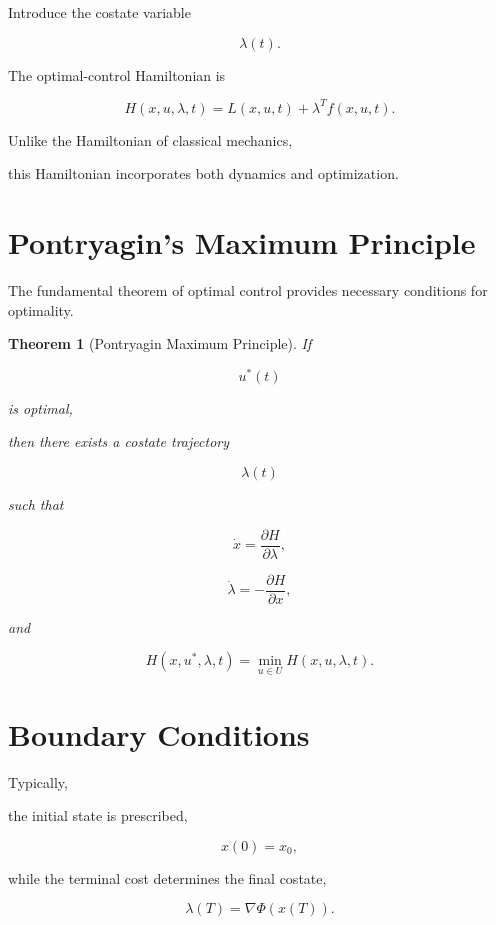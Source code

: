 \documentclass[11pt,fleqn]{book}
\numberwithin{equation}{chapter}
\theoremstyle{plain}
\newtheorem{theorem}{Theorem}[chapter]
\theoremstyle{definition}
\theoremstyle{remark}
\begin{document}
Introduce the costate variable

\[
\lambda(t).
\]

The optimal-control Hamiltonian is

\[
\boxed{
H(x,u,\lambda,t)
=
L(x,u,t)
+
\lambda^{T}f(x,u,t).
}
\]

Unlike the Hamiltonian of classical mechanics,

this Hamiltonian incorporates both dynamics and optimization.


\section{Pontryagin's Maximum Principle}

The fundamental theorem of optimal control provides necessary conditions
for optimality.

\begin{theorem}[Pontryagin Maximum Principle]

If

\[
u^*(t)
\]

is optimal,

then there exists a costate trajectory

\[
\lambda(t)
\]

such that

\[
\boxed{
\dot{x}
=
\frac{\partial H}{\partial\lambda},
}
\]

\[
\boxed{
\dot{\lambda}
=
-
\frac{\partial H}{\partial x},
}
\]

and

\[
\boxed{
H(x,u^*,\lambda,t)
=
\min_{u\in U}
H(x,u,\lambda,t).
}
\]

\end{theorem}


\section{Boundary Conditions}

Typically,

the initial state is prescribed,

\[
x(0)=x_0,
\]

while the terminal cost determines the final costate,

\[
\boxed{
\lambda(T)
=
\nabla\Phi(x(T)).
}
\]
\end{document}
